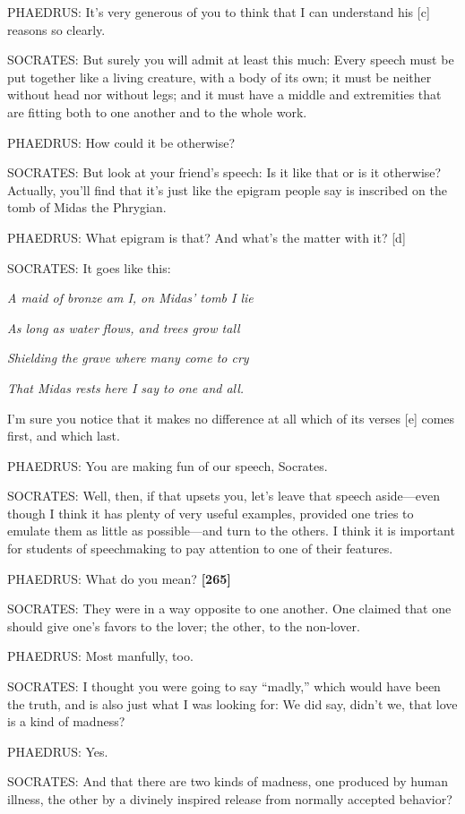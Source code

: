PHAEDRUS: It's very generous of you to think that I can understand his
{[}c{]} reasons so clearly.

SOCRATES: But surely you will admit at least this much: Every speech
must be put together like a living creature, with a body of its own; it
must be neither without head nor without legs; and it must have a middle
and extremities that are fitting both to one another and to the whole
work.

PHAEDRUS: How could it be otherwise?

SOCRATES: But look at your friend's speech: Is it like that or is it
otherwise? Actually, you'll find that it's just like the epigram people
say is inscribed on the tomb of Midas the Phrygian.

PHAEDRUS: What epigram is that? And what's the matter with it? {[}d{]}

SOCRATES: It goes like this:\crlf
\crlf

{\em A maid of bronze am I, on Midas' tomb I lie}

{\em As long as water flows, and trees grow tall}

{\em Shielding the grave where many come to cry}

{\em That Midas rests here I say to one and all.}\crlf
\crlf

I'm sure you notice that it makes no difference at all which of its
verses {[}e{]} comes first, and which last.

PHAEDRUS: You are making fun of our speech, Socrates.

SOCRATES: Well, then, if that upsets you, let's leave that speech
aside---even though I think it has plenty of very useful examples,
provided one tries to emulate them as little as possible---and turn to
the others. I think it is important for students of speechmaking to pay
attention to one of their features.

PHAEDRUS: What do you mean? {\bf {[}265{]}}

SOCRATES: They were in a way opposite to one another. One claimed that
one should give one's favors to the lover; the other, to the non-lover.

PHAEDRUS: Most manfully, too.

SOCRATES: I thought you were going to say “madly,” which would have been
the truth, and is also just what I was looking for: We did say, didn't
we, that love is a kind of madness?

PHAEDRUS: Yes.

SOCRATES: And that there are two kinds of madness, one produced by human
illness, the other by a divinely inspired release from normally accepted
behavior?

